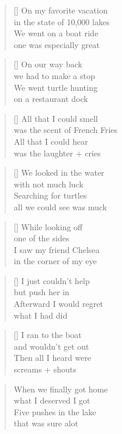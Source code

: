 \settowidth{\versewidth}{was the scent of French fries}
\begin{verse}[\versewidth]
On my favorite vacation\\
in the state of 10,000 lakes\\
We went on a boat ride\\
one was especially great\\
\end{verse}

\begin{verse}[\versewidth]
On our way back\\
we had to make a stop\\
We went turtle hunting\\
on a restaurant dock\\
\end{verse}

\begin{verse}[\versewidth]
All that I could smell\\
was the scent of French Fries\\
All that I could hear\\
was the laughter + cries\\
\end{verse}

\begin{verse}[\versewidth]
We looked in the water\\
with not much luck\\
Searching for turtles\\
all we could see was muck\\
\end{verse}

\begin{verse}[\versewidth]
While looking off\\
one of the sides\\
I saw my friend Chelsea\\
in the corner of my eye\\
\end{verse}

\begin{verse}[\versewidth]
I just couldn't help\\
but push her in\\
Afterward I would regret\\
what I had did\\
\end{verse}

\begin{verse}[\versewidth]
I ran to the boat\\
and wouldn't get out\\
Then all I heard were\\
screams + shouts\\
\end{verse}

\begin{verse}
When we finally got home\\
what I deserved I got\\
Five pushes in the lake\\
that was sure alot\\
\end{verse}

